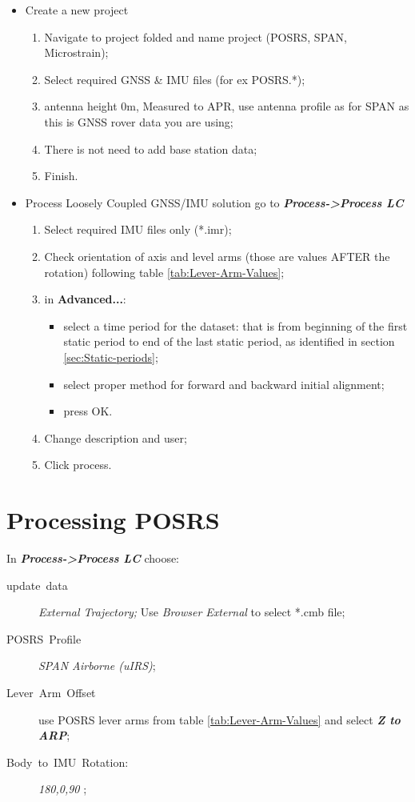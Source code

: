 \documentclass[11pt,fleqn]{book} %
\begin{document}
\medskip
\begin{itemize}
	\item Create a new project 
	\begin{enumerate}
		\item Navigate to project folded and name project (POSRS, SPAN, Microstrain);
		\item Select required GNSS \& IMU files (for ex POSRS.{*});
		\item antenna height 0m, Measured to APR, use antenna profile as for SPAN as this is GNSS rover data you are using;
		\item There is not need to add base station data;
		\item Finish.
	\end{enumerate}
	\item Process Loosely Coupled GNSS/IMU solution go to \textbf{\emph{Process->Process LC}}
		\begin{enumerate}
			\item Select required IMU files only ({*}.imr);
			\item Check orientation of axis and level arms (those are values AFTER the rotation) following table \ref{tab:Lever-Arm-Values};
			\item in \textbf{Advanced...}:
			\begin{itemize}
			 	\item select a time period for the dataset: that is from beginning of the first static period to end of the last static period, as identified in section \ref{sec:Static-periods};
			 	\item select proper method for forward and backward initial alignment;
			 	\item press OK.
			 \end{itemize} 
			\item Change description and user;
			\item Click process.
		\end{enumerate}
\end{itemize}



\section{Processing POSRS\label{sub:Processing-POSRS}}

In \textbf{\emph{Process->Process LC}} choose:
\begin{description}
	\item [{update~data}] \emph{External Trajectory; }Use \emph{Browser External} to select {*}.cmb file;
	\item [{POSRS~Profile}] \emph{SPAN Airborne (uIRS)};
	\item [{Lever~Arm~Offset}] use POSRS lever arms from table \ref{tab:Lever-Arm-Values} and select \textbf{\emph{Z to ARP}};
	\item [{Body~to~IMU~Rotation:}] \emph{180,0,90 };
\end{description}
	
\end{document}
